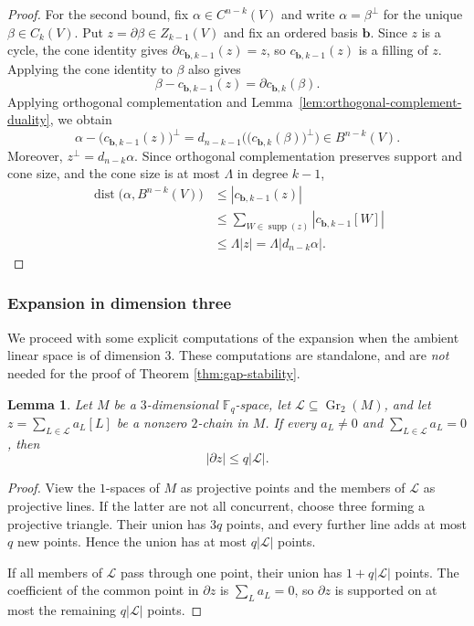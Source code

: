 \documentclass[11pt]{article}
\numberwithin{equation}{section}
\newtheorem{lemma}[theorem]{Lemma}
\newcommand{\F}{\mathbb F}
\newcommand{\Gr}{\operatorname{Gr}}
\newcommand{\supp}{\operatorname{supp}}
\begin{document}
\begin{proof}
For the second bound, fix $\alpha\in C^{n-k}(V)$ and write
$\alpha=\beta^\perp$ for the unique $\beta\in C_k(V)$. Put
$z=\partial\beta\in Z_{k-1}(V)$ and fix an ordered basis $\mathbf b$.
Since $z$ is a cycle, the cone identity gives
$\partial c_{\mathbf b,k-1}(z)=z$, so
$c_{\mathbf b,k-1}(z)$ is a filling of $z$. Applying the cone identity
to $\beta$ also gives
\[
 \beta-c_{\mathbf b,k-1}(z)
 =
 \partial c_{\mathbf b,k}(\beta).
\]
Applying orthogonal complementation and
Lemma~\ref{lem:orthogonal-complement-duality}, we obtain
\[
 \alpha-\bigl(c_{\mathbf b,k-1}(z)\bigr)^\perp
 =
 d_{n-k-1}\bigl(\bigl(c_{\mathbf b,k}(\beta)\bigr)^\perp\bigr)
 \in B^{n-k}(V).
\]
Moreover, $z^\perp=d_{n-k}\alpha$. Since orthogonal complementation
preserves support and cone size, and the cone size is at most $\Lambda$ in degree
$k-1$,
\begin{align*}
 \operatorname{dist}\bigl(\alpha,B^{n-k}(V)\bigr)
 &\le |c_{\mathbf b,k-1}(z)|\\
 &\le
 \sum_{W\in\supp(z)}|c_{\mathbf b,k-1}[W]|\\
 &\le \Lambda|z|
 =\Lambda|d_{n-k}\alpha|.
\end{align*}
\end{proof}



\subsubsection*{Expansion in dimension three}

We proceed with some explicit computations of the expansion when the ambient linear space is of dimension $3$. These computations are standalone, and are \emph{not} needed for the proof of Theorem \ref{thm:gap-stability}.

\begin{lemma}
\label{lem:weighted-projective-lines}
Let $M$ be a $3$-dimensional $\F_q$-space, let
$\mathcal L\subseteq\Gr_2(M)$, and let
$z=\sum_{L\in\mathcal L}a_L[L]$ be a nonzero $2$-chain in $M$.
If every $a_L\ne0$ and $\sum_{L\in\mathcal L}a_L=0$, then
\[
 |\partial z|\le q|\mathcal L|.
\]
\end{lemma}

\begin{proof}
View the $1$-spaces of $M$ as projective points and the members of
$\mathcal L$ as projective lines. If the latter are not all
concurrent, choose three forming a projective triangle. Their union
has $3q$ points, and every further line adds at most $q$ new points.
Hence the union has at most $q|\mathcal L|$ points.

If all members of $\mathcal L$ pass through one point, their union
has $1+q|\mathcal L|$ points. The coefficient of the common point in
$\partial z$ is $\sum_La_L=0$, so $\partial z$ is supported on at
most the remaining $q|\mathcal L|$ points.
\end{proof}
\end{document}
